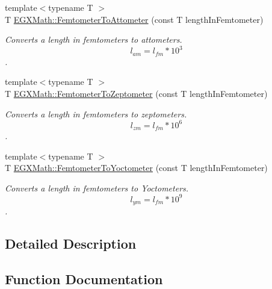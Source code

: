 \begin{DoxyCompactItemize}
{\footnotesize template$<$typename T $>$ }\\T \mbox{\hyperlink{group___e_g_x_math-_conversions-_length_conversions-_femtometer-_s_i_ga62157df6cfd3d6b801c521105b7f4f71}{E\+G\+X\+Math\+::\+Femtometer\+To\+Attometer}} (const T length\+In\+Femtometer)
\begin{DoxyCompactList}\small\item\em Converts a length in femtometers to attometers. \[ l_{am}=l_{fm} * 10^{3} \]. \end{DoxyCompactList}\item 
{\footnotesize template$<$typename T $>$ }\\T \mbox{\hyperlink{group___e_g_x_math-_conversions-_length_conversions-_femtometer-_s_i_ga9bcc5cf611f6646652effc080ce29f1a}{E\+G\+X\+Math\+::\+Femtometer\+To\+Zeptometer}} (const T length\+In\+Femtometer)
\begin{DoxyCompactList}\small\item\em Converts a length in femtometers to zeptometers. \[ l_{zm}=l_{fm} * 10^{6} \]. \end{DoxyCompactList}\item 
{\footnotesize template$<$typename T $>$ }\\T \mbox{\hyperlink{group___e_g_x_math-_conversions-_length_conversions-_femtometer-_s_i_ga6406395140da34327a85098a7dd9e4f0}{E\+G\+X\+Math\+::\+Femtometer\+To\+Yoctometer}} (const T length\+In\+Femtometer)
\begin{DoxyCompactList}\small\item\em Converts a length in femtometers to Yoctometers. \[ l_{ym}=l_{fm} * 10^{9} \]. \end{DoxyCompactList}\end{DoxyCompactItemize}


\subsection{Detailed Description}


\subsection{Function Documentation}
\mbox{\label{group___e_g_x_math-_conversions-_length_conversions-_femtometer-_s_i_ga62157df6cfd3d6b801c521105b7f4f71}} 
